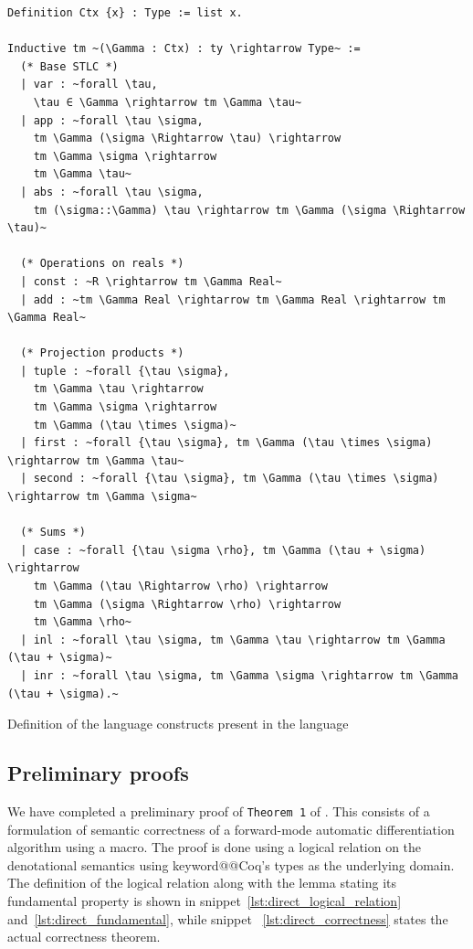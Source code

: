 \documentclass[12pt, final]{article}
\makeatletter
\def\<#1>{\csname keyword@@#1\endcsname}
\makeatother
\begin{document}
\begin{listing}
  \begin{verbatim}
Definition Ctx {x} : Type := list x.

Inductive tm ~(\Gamma : Ctx) : ty \rightarrow Type~ :=
  (* Base STLC *)
  | var : ~forall \tau,
    \tau ∈ \Gamma \rightarrow tm \Gamma \tau~
  | app : ~forall \tau \sigma,
    tm \Gamma (\sigma \Rightarrow \tau) \rightarrow
    tm \Gamma \sigma \rightarrow
    tm \Gamma \tau~
  | abs : ~forall \tau \sigma,
    tm (\sigma::\Gamma) \tau \rightarrow tm \Gamma (\sigma \Rightarrow \tau)~

  (* Operations on reals *)
  | const : ~R \rightarrow tm \Gamma Real~
  | add : ~tm \Gamma Real \rightarrow tm \Gamma Real \rightarrow tm \Gamma Real~

  (* Projection products *)
  | tuple : ~forall {\tau \sigma},
    tm \Gamma \tau \rightarrow
    tm \Gamma \sigma \rightarrow
    tm \Gamma (\tau \times \sigma)~
  | first : ~forall {\tau \sigma}, tm \Gamma (\tau \times \sigma) \rightarrow tm \Gamma \tau~
  | second : ~forall {\tau \sigma}, tm \Gamma (\tau \times \sigma) \rightarrow tm \Gamma \sigma~

  (* Sums *)
  | case : ~forall {\tau \sigma \rho}, tm \Gamma (\tau + \sigma) \rightarrow
    tm \Gamma (\tau \Rightarrow \rho) \rightarrow
    tm \Gamma (\sigma \Rightarrow \rho) \rightarrow
    tm \Gamma \rho~
  | inl : ~forall \tau \sigma, tm \Gamma \tau \rightarrow tm \Gamma (\tau + \sigma)~
  | inr : ~forall \tau \sigma, tm \Gamma \sigma \rightarrow tm \Gamma (\tau + \sigma).~

  \end{verbatim}
  \caption{Definition of the language constructs present in the language}
  \label{lst:stlc_terms}
\end{listing}

\subsection{Preliminary proofs}

We have completed a preliminary proof of \texttt{Theorem 1} of \cite{huot2020correctness}. This consists of a formulation of semantic correctness of a forward-mode automatic differentiation algorithm using a macro. The proof is done using a logical relation on the denotational semantics using \<Coq>'s types as the underlying domain. The definition of the logical relation along with the lemma stating its fundamental property is shown in snippet~\ref{lst:direct_logical_relation} and~\ref{lst:direct_fundamental}, while snippet~ \ref{lst:direct_correctness} states the actual correctness theorem.
\end{document}
